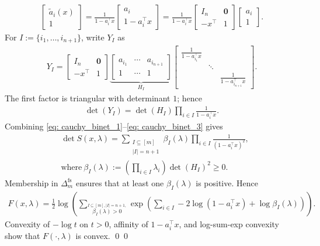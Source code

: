 \documentclass[smallextended]{svjour3}
\let\springerproof\proof
\let\endspringerproof\endproof
\renewenvironment{proof}{\springerproof}{%
  \ifhmode\qed\else\leavevmode\qed\fi\endspringerproof}
\begin{document}
\begin{proof}
\begin{align*}
\begin{bmatrix}
            \tilde{a}_i(x)\\ 1
        \end{bmatrix} =  \frac{1}{1-a_i^\top x}
        \begin{bmatrix}
            a_i \\ 1-a_i^\top x
        \end{bmatrix}
        = \frac{1}{1-a_i^\top x}
        \begin{bmatrix}
            I_n & \mathbf{0} \\
            -x^\top & 1
        \end{bmatrix}
        \begin{bmatrix}
            a_i \\ 1
        \end{bmatrix}.
    \end{align*}
    For $I:=\{i_1,\ldots,i_{n+1}\}$, write $Y_I$ as
    \begin{align*}
        Y_I =
        \begin{bmatrix}
            I_n & \mathbf{0} \\
            -x^\top & 1
        \end{bmatrix}
        \underbrace{
        \begin{bmatrix}
            a_{i_1} & \cdots & a_{i_{n+1}} \\
            1 & \cdots & 1
        \end{bmatrix}
        }_{H_I}
        \begin{bmatrix}
            \frac{1}{1-a_{i_1}^\top x} & & \\
            & \ddots& \\
            & & \frac{1}{1 - a_{i_{n+1}}^\top x}
        \end{bmatrix}.
    \end{align*}
    The first factor is triangular with determinant $1$; hence
    \begin{align}\label{eq: cauchy_binet_3}
        \det(Y_I) = \det(H_I) \prod_{i\in I} \frac{1}{1-a_i^\top x}.
    \end{align}
    Combining \eqref{eq: cauchy_binet_1}--\eqref{eq: cauchy_binet_3} gives
    \begin{align*}
        & \det S(x, \lambda) = \sum_{\substack{I\subseteq[m]\\|I|=n+1}} \beta_I(\lambda) \prod_{i\in I} \frac{1}{(1-a_i^\top x)^2}, \\
        & \text{where}~ \beta_I(\lambda):=  \left(\prod_{i\in I}\lambda_i\right)\det(H_I)^2 \geq 0.
    \end{align*}
    Membership in $\Delta_m^{\mathrm{fs}}$ ensures that at least one
    $\beta_I(\lambda)$ is positive. Hence
    \begin{align*}
        F(x, \lambda) = \frac{1}{2}\log \left( \sum_{\stackrel{I\subseteq[m], |I|=n+1, }{\beta_I(\lambda) > 0}} \exp\left( \sum_{i\in I} - 2\log(1-a_i^\top x) + \log \beta_I(\lambda) \right)\right).
    \end{align*}
    Convexity of $-\log t$ on $t>0$, affinity of $1-a_i^\top x$, and
    log-sum-exp convexity show that $F(\cdot,\lambda)$ is convex.
\end{proof}
\end{document}
